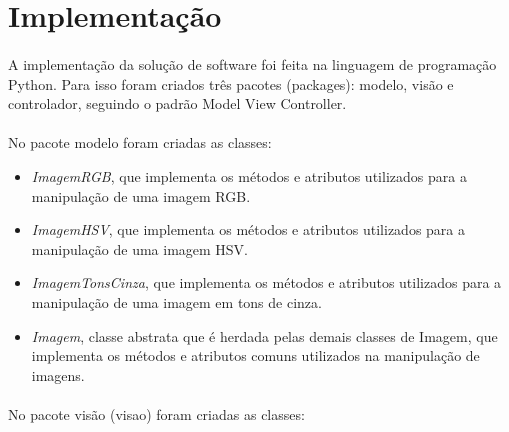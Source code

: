 \documentclass[12pt]{article}
\begin{document}
\section{Implementação}

\paragraph{}A implementação da solução de software foi feita na linguagem de programação Python. Para isso foram criados três pacotes (packages): modelo, visão e controlador, seguindo o padrão Model View Controller.

\paragraph{}No pacote modelo foram criadas as classes:

\begin{itemize}
    \item \textit{ImagemRGB}, que implementa os métodos e atributos utilizados para a manipulação de uma imagem RGB.
    
    \item \textit{ImagemHSV}, que implementa os métodos e atributos utilizados para a manipulação de uma imagem HSV.
    
    \item \textit{ImagemTonsCinza}, que implementa os métodos e atributos utilizados para a manipulação de uma imagem em tons de cinza.
    
    \item \textit{Imagem}, classe abstrata que é herdada pelas demais classes de Imagem, que implementa os métodos e atributos comuns utilizados na manipulação de imagens.
\end{itemize}

\paragraph{}No pacote visão (visao) foram criadas as classes:
\end{document}
